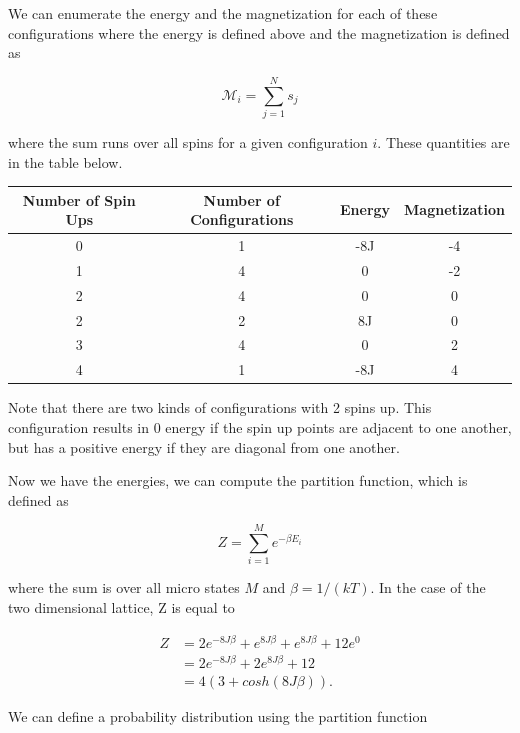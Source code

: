 \documentclass[%
oneside,                 %
final,                   %
10pt]{article}
\begin{document}
We can enumerate the energy and the magnetization for each of these configurations where the energy is defined above and the magnetization is defined as 

\begin{equation*}
\mathcal{M}_i = \sum_{j=1}^N s_j
\end{equation*}

where the sum runs over all spins for a given configuration $i$.  These quantities are in the table below.

\begin{center} 
\begin{tabular}{ |c|c|c|c| }
\hline
Number of Spin Ups & Number of Configurations & Energy & Magnetization \\
\hline
0 & 1 & -8J  & -4\\ 
1& 4  & 0  & -2\\ 
2 & 4 & 0  & 0\\ 
2 & 2 & 8J & 0 \\
3 & 4 & 0  & 2\\ 
4 & 1 & -8J  & 4\\ 
\hline
\end{tabular}
\label{table:test}
\end{center}

Note that there are two kinds of configurations with 2 spins up.  This configuration results in 0 energy if the spin up points are adjacent to one another, but has a positive energy if they are diagonal from one another.

Now we have the energies, we can compute the partition function, which is defined as

\begin{equation*}
Z=\sum_{i=1}^M e^{-\beta E_i}
\end{equation*}

where the sum is over all micro states $M$ and $\beta = 1/(kT)$. In the case of the two dimensional lattice, Z is equal to

\begin{equation*}
\begin{split}
Z & =2e^{-8J \beta} +e^{8J \beta} + e^{8J \beta} + 12 e^{0}\\
& = 2e^{-8J \beta} +2e^{8J \beta}+12\\
& = 4 (3+cosh(8 J \beta)).
\end{split}
\end{equation*}

We can define a probability distribution using the partition function
\end{document}

